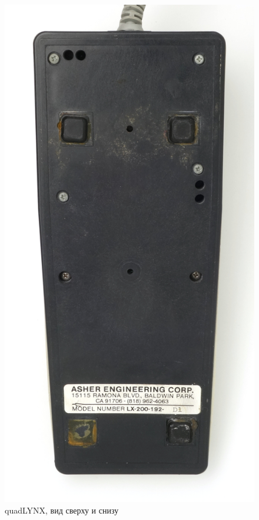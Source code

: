 \documentclass[11pt, a4paper]{article}
\begin{document}
\begin{figure}[h]
    \includegraphics[scale=0.41]{1986_honeywell_asher_quadlynx_trackball/bottom_30.jpg}
    \caption{quadLYNX, вид сверху и снизу}
    \label{fig:quadLYNXTopBottom}
\end{figure}
\end{document}
